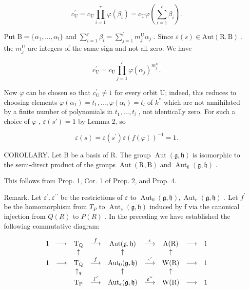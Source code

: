 \[
c _ {\mathrm{U}} ^ {\prime} = c _ {\mathrm{U}} \prod_ {i = 1} ^ {r} \varphi (\beta_ {i}) = c _ {\mathrm{U}} \varphi \left(\sum_ {i = 1} ^ {r} \beta_ {i}\right).
\]

Put \(\mathrm{B} = \{\alpha_1, \ldots, \alpha_l\}\) and \(\sum_{i=1}^{r} \beta_i = \sum_{j=1}^{l} m_j^{\mathrm{U}} \alpha_j\) . Since \(\varepsilon(s) \in \mathrm{Aut}(\mathrm{R}, \mathrm{B})\) , the \(m_j^{\mathrm{U}}\) are integers of the same sign and not all zero. We have

\[
c _ {\mathrm{U}} ^ {\prime} = c _ {\mathrm{U}} \prod_ {j = 1} ^ {l} \varphi (\alpha_ {j}) ^ {m _ {j} ^ {\mathrm{U}}}.
\]

Now \(\varphi\) can be chosen so that \(c_{\mathrm{U}}^{\prime} \neq 1\) for every orbit U; indeed, this reduces to choosing elements \(\varphi(\alpha_1) = t_1, \ldots, \varphi(\alpha_l) = t_l\) of \(k^*\) which are not annihilated by a finite number of polynomials in \(t_1, \ldots, t_l\) , not identically zero. For such a choice of \(\varphi\) , \(\varepsilon(s') = 1\) by Lemma 2, so

\[
\varepsilon (s) = \varepsilon (s ^ {\prime}) \varepsilon (f (\varphi)) ^ {- 1} = 1.
\]

COROLLARY. Let B be a basis of R. The group \(\operatorname{Aut}(\mathfrak{g},\mathfrak{h})\) is isomorphic to the semi-direct product of the groups \(\operatorname{Aut}(\mathrm{R},\mathrm{B})\) and \(\operatorname{Aut}_{0}(\mathfrak{g},\mathfrak{h})\) .

This follows from Prop. 1, Cor. 1 of Prop. 2, and Prop. 4.

Remark. Let \(\varepsilon^{\prime},\varepsilon^{\prime\prime}\) be the restrictions of \(\varepsilon\) to \(\operatorname{Aut}_{0}(\mathfrak{g},\mathfrak{h}),\operatorname{Aut}_{e}(\mathfrak{g},\mathfrak{h})\) . Let \(f^{\prime}\) be the homomorphism from \(T_{P}\) to \(\operatorname{Aut}_{e}(\mathfrak{g},\mathfrak{h})\) induced by f via the canonical injection from \(Q(R)\) to \(P(R)\) . In the preceding we have established the following commutative diagram:

\[
\begin{array}{c c c c c c c c c} 1 & \longrightarrow & \mathrm{T} _ {\mathrm{Q}} & \stackrel {{f}} {{\longrightarrow}} & \mathrm{Aut} (\mathfrak {g}, \mathfrak {h}) & \stackrel {{\varepsilon}} {{\longrightarrow}} & \mathrm{A} (\mathrm{R}) & \longrightarrow & 1 \\ & & \uparrow & & \uparrow & & \uparrow & & \\ 1 & \longrightarrow & \mathrm{T} _ {\mathrm{Q}} & \stackrel {{f}} {{\longrightarrow}} & \mathrm{Aut} _ {0} (\mathfrak {g}, \mathfrak {h}) & \stackrel {{\varepsilon^ {\prime}}} {{\longrightarrow}} & \mathrm{W} (\mathrm{R}) & \longrightarrow & 1 \\ & & \uparrow_ {q} & & \uparrow & & \uparrow & & \\ & & \mathrm{T} _ {\mathrm{P}} & \stackrel {{f ^ {\prime}}} {{\longrightarrow}} & \mathrm{Aut} _ {e} (\mathfrak {g}, \mathfrak {h}) & \stackrel {{\varepsilon^ {\prime \prime}}} {{\longrightarrow}} & \mathrm{W} (\mathrm{R}) & \longrightarrow & 1 \end{array}
\]

